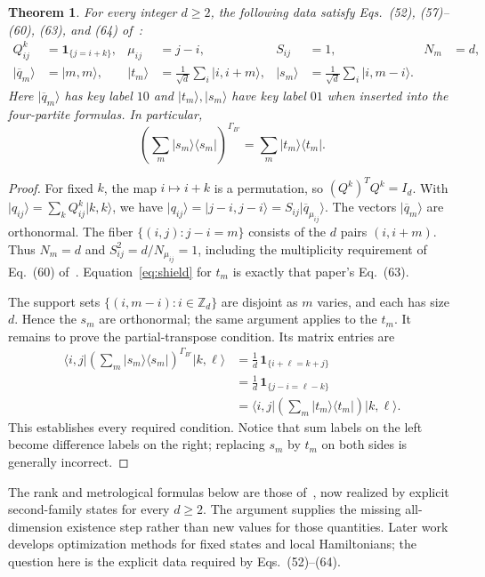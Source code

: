 \documentclass[11pt]{article}
\newcommand{\ket}[1]{\lvert #1\rangle}
\newcommand{\bra}[1]{\langle #1\rvert}
\newcommand{\proj}[1]{\ket{#1}\bra{#1}}
\newtheorem{theorem}{Theorem}
\begin{document}
\begin{theorem}\label{thm:cyclic}
For every integer $d\geq2$, the following data satisfy
Eqs.\ (52), (57)--(60), (63), and (64) of~\cite{Pal2021}:
\begin{align}
 Q^k_{ij}&=\mathbf1_{\{j=i+k\}}, &
 \mu_{ij}&=j-i, & S_{ij}&=1, & N_m&=d,\label{eq:data}\\
 \ket{\overline q_m}&=\ket{m,m}, &
 \ket{t_m}&=\frac1{\sqrt d}\sum_i\ket{i,i+m}, &
 \ket{s_m}&=\frac1{\sqrt d}\sum_i\ket{i,m-i}.
 \label{eq:shield}
\end{align}
Here $\ket{\overline q_m}$ has key label $10$ and
$\ket{t_m},\ket{s_m}$ have key label $01$ when inserted into the
four-partite formulas. In particular,
\begin{equation}\label{eq:ptshield}
 \left(\sum_m\proj{s_m}\right)^{\Gamma_{B'}}
       =\sum_m\proj{t_m}.
\end{equation}
\end{theorem}

\begin{proof}
For fixed $k$, the map $i\mapsto i+k$ is a permutation, so
$(Q^k)^TQ^k=I_d$. With
$\ket{q_{ij}}=\sum_k Q^k_{ij}\ket{k,k}$, we have
$\ket{q_{ij}}=\ket{j-i,j-i}=S_{ij}\ket{\overline q_{\mu_{ij}}}$.
The vectors $\ket{\overline q_m}$ are orthonormal.
The fiber $\{(i,j):j-i=m\}$ consists of the $d$ pairs $(i,i+m)$.
Thus $N_m=d$ and $S_{ij}^2=d/N_{\mu_{ij}}=1$, including the
multiplicity requirement of Eq.\ (60) of~\cite{Pal2021}.
Equation~\eqref{eq:shield} for $t_m$ is exactly that paper's Eq.\ (63).

The support sets $\{(i,m-i):i\in\mathbb Z_d\}$ are disjoint as $m$
varies, and each has size $d$. Hence the $s_m$ are orthonormal;
the same argument applies to the $t_m$.
It remains to prove the partial-transpose condition. Its matrix entries are
\begin{align*}
 \bra{i,j}\left(\sum_m\proj{s_m}\right)^{\Gamma_{B'}}\ket{k,\ell}
 &=\frac1d\,\mathbf1_{\{i+\ell=k+j\}}\\
 &=\frac1d\,\mathbf1_{\{j-i=\ell-k\}}\\
 &=\bra{i,j}\left(\sum_m\proj{t_m}\right)\ket{k,\ell}.
\end{align*}
This establishes every required condition. Notice that sum labels on the
left become difference labels on the right; replacing $s_m$ by $t_m$
on both sides is generally incorrect.
\end{proof}

The rank and metrological formulas below are those of~\cite{Pal2021},
now realized by explicit second-family states for every $d\geq2$.
The argument supplies the missing all-dimension existence step rather than
new values for those quantities. Later work~\cite{Lukacs2026} develops
optimization methods for fixed states and local Hamiltonians; the question
here is the explicit data required by Eqs.\ (52)--(64).
\end{document}
